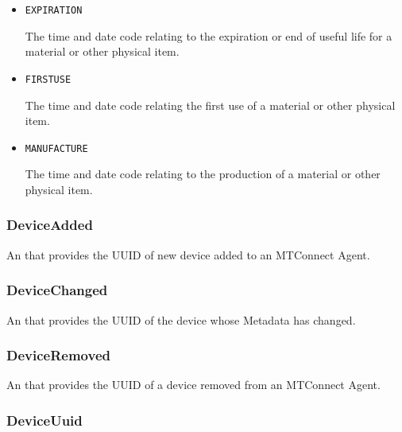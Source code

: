 \begin{itemize}

\item \texttt{EXPIRATION}


The time and date code relating to the expiration or end of useful life for a material or other physical item.

\item \texttt{FIRST\textunderscore USE}


The time and date code relating the first use of a material or other physical item.

\item \texttt{MANUFACTURE}


The time and date code relating to the production of a material or other physical item.


\end{itemize}






\subsubsection{DeviceAdded}
\label{sec:DeviceAdded}



An  that provides the \gls{UUID} of new device added to an \gls{MTConnect Agent}.



\subsubsection{DeviceChanged}
\label{sec:DeviceChanged}



An  that provides the \gls{UUID} of the device whose \gls{Metadata} has changed.



\subsubsection{DeviceRemoved}
\label{sec:DeviceRemoved}



An  that provides the \gls{UUID} of a device removed from an \gls{MTConnect Agent}.



\subsubsection{DeviceUuid}
\label{sec:DeviceUuid}



